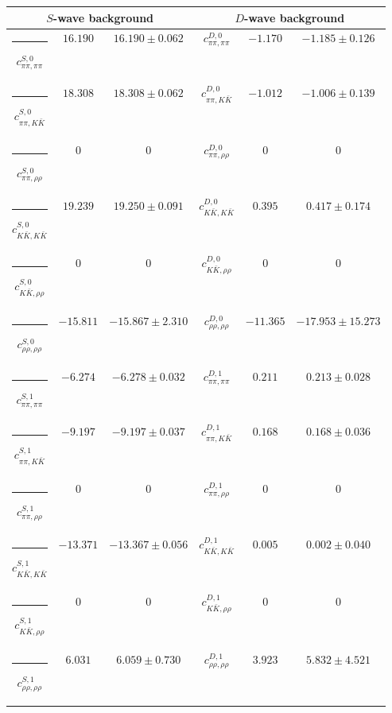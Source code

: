 \begin{table}[h]
\begin{ruledtabular}
\begin{tabular}{c c c c c c c c c}
\end{tabular}
\vspace{2em}
\begin{tabular}{c c c c c c}
\multicolumn{3}{c}{$S$-wave background}  & \multicolumn{3}{c}{$D$-wave background} \\ \hline
\rule[-0.2cm]{-0.1cm}{.55cm} $c^{S,0}_{\pi\pi,\pi\pi}$ &$16.190$ & $16.190 \pm 0.062$ & $c^{D,0}_{\pi\pi,\pi\pi}$ &$-1.170$ & $-1.185 \pm 0.126$ \\
\rule[-0.2cm]{-0.1cm}{.55cm} $c^{S,0}_{\pi\pi,K\bar K}$ &$18.308$ & $18.308 \pm 0.062$ & $c^{D,0}_{\pi\pi,K\bar K}$ &$-1.012$ & $-1.006 \pm 0.139$ \\
\rule[-0.2cm]{-0.1cm}{.55cm} $c^{S,0}_{\pi\pi,\rho\rho}$ &$0$ & $0$ & $c^{D,0}_{\pi\pi,\rho\rho}$ &$0$ & $0$ \\
\rule[-0.2cm]{-0.1cm}{.55cm} $c^{S,0}_{K\bar K,K\bar K}$ &$19.239$ & $19.250 \pm 0.091$ & $c^{D,0}_{K\bar K,K\bar K}$ &$0.395$ & $0.417 \pm 0.174$ \\
\rule[-0.2cm]{-0.1cm}{.55cm} $c^{S,0}_{K\bar K,\rho\rho}$ &$0$ & $0$ & $c^{D,0}_{K\bar K,\rho\rho}$ &$0$ & $0$ \\
\rule[-0.2cm]{-0.1cm}{.55cm} $c^{S,0}_{\rho\rho,\rho\rho}$ &$-15.811$ & $-15.867 \pm 2.310$ & $c^{D,0}_{\rho\rho,\rho\rho}$ &$-11.365$ & $-17.953 \pm 15.273$ \\
\rule[-0.2cm]{-0.1cm}{.55cm} $c^{S,1}_{\pi\pi,\pi\pi}$ &$-6.274$ & $-6.278 \pm 0.032$ & $c^{D,1}_{\pi\pi,\pi\pi}$ &$0.211$ & $0.213 \pm 0.028$ \\
\rule[-0.2cm]{-0.1cm}{.55cm} $c^{S,1}_{\pi\pi,K\bar K}$ &$-9.197$ & $-9.197 \pm 0.037$ & $c^{D,1}_{\pi\pi,K\bar K}$ &$0.168$ & $0.168 \pm 0.036$ \\
\rule[-0.2cm]{-0.1cm}{.55cm} $c^{S,1}_{\pi\pi,\rho\rho}$ &$0$ & $0$ & $c^{D,1}_{\pi\pi,\rho\rho}$ &$0$ & $0$ \\
\rule[-0.2cm]{-0.1cm}{.55cm} $c^{S,1}_{K\bar K,K\bar K}$ &$-13.371$ & $-13.367 \pm 0.056$ & $c^{D,1}_{K\bar K,K\bar K}$ &$0.005$ & $0.002 \pm 0.040$ \\
\rule[-0.2cm]{-0.1cm}{.55cm} $c^{S,1}_{K\bar K,\rho\rho}$ &$0$ & $0$ & $c^{D,1}_{K\bar K,\rho\rho}$ &$0$ & $0$ \\
\rule[-0.2cm]{-0.1cm}{.55cm} $c^{S,1}_{\rho\rho,\rho\rho}$ &$6.031$ & $6.059 \pm 0.730$ & $c^{D,1}_{\rho\rho,\rho\rho}$ &$3.923$ & $5.832 \pm 4.521$ \\
\end{tabular}
\end{ruledtabular}
\end{table}
